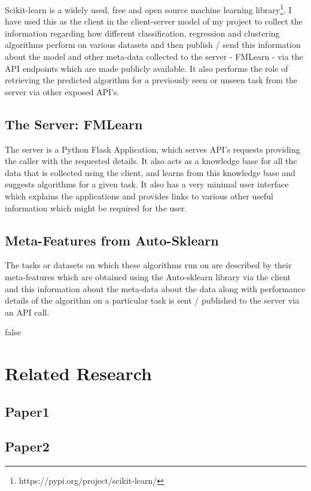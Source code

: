 Scikit-learn \citep{scikit-learn} is a widely used, free and open source machine learning library\footnote{https://pypi.org/project/scikit-learn/}. I have used this as the client in the client-server model of my project to collect the information regarding how different classification, regression and clustering algorithms perform on various datasets and then publish / send this information about the model and other meta-data collected to the server - FMLearn - via the API endpoints which are made publicly available. It  also performs the role of retrieving the predicted algorithm for a previously seen or unseen task from the server via other exposed API's.

\subsection{The Server: FMLearn}
The server is a Python Flask Application, which serves API's requests providing the caller with the requested details. It also acts as a knowledge base for all the data that is collected using the client, and learns from this knowledge base and suggests algorithms for a given task. It also has a very minimal user interface which explains the applications and provides links to various other useful information which might be required for the user.

\subsection{Meta-Features from Auto-Sklearn}
The tasks or datasets on which these algorithms run on are described by their meta-features which are obtained using the Auto-sklearn \citep{feurer:m} library via the client and this information about the meta-data about the data along with performance details of the algorithm on a particular task is sent / published to the server via an API call.



\if false

\section{Related Research}

\subsection{Paper1}
\subsection{Paper2}
